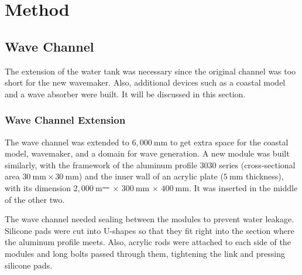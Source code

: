 \section{Method}

\subsection{Wave Channel}

The extension of the water tank was necessary since the original channel was too short for the new wavemaker. Also, additional devices such as a coastal model and a wave absorber were built. It will be discussed in this section.

\subsubsection{Wave Channel Extension}%

The wave channel was extended to $6,000\mathrm{~mm}$ to get extra space for the coastal model, wavemaker, and a domain for wave generation. A new module was built similarly, with the framework of the aluminum profile 3030 series (cross-sectional area $30\mathrm{~mm} \times 30\mathrm{~mm}$) and the inner wall of an acrylic plate ($5\mathrm{~mm}$ thickness), with its dimension $2,000\mathrm{~mㅡ}$ $\times$ $300\mathrm{~mm}$ $\times$ $400\mathrm{~mm}$. It was inserted in the middle of the other two.

The wave channel needed sealing between the modules to prevent water leakage. Silicone pads were cut into U-shapes so that they fit right into the section where the aluminum profile meets. Also, acrylic rods were attached to each side of the modules and long bolts passed through them, tightening the link and pressing silicone pads.


